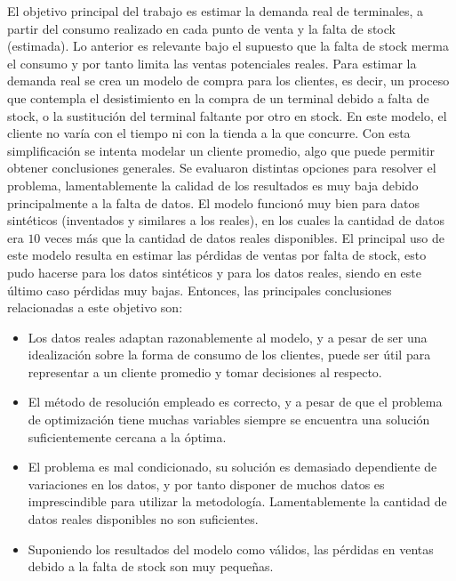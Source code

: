El objetivo principal del trabajo es estimar la demanda real de terminales, 
a partir del consumo realizado en cada punto de venta y la falta de stock (estimada).
Lo anterior es relevante bajo el supuesto que la falta de stock merma el consumo y por tanto limita las ventas potenciales reales.
Para estimar la demanda real se crea un modelo de compra para los clientes, 
es decir, un proceso que contempla el desistimiento en la compra de un terminal debido a falta de stock,
o la sustitución del terminal faltante por otro en stock.
En este modelo, el cliente no varía con el tiempo ni con la tienda a la que concurre. 
Con esta simplificación se intenta modelar un cliente promedio, algo que puede permitir obtener conclusiones generales.
Se evaluaron distintas opciones para resolver el problema,
lamentablemente la calidad de los resultados es muy baja debido principalmente a la falta de datos.
El modelo funcionó muy bien para datos sintéticos (inventados y similares a los reales), 
en los cuales la cantidad de datos era $10$ veces más que la cantidad de datos reales disponibles.
El principal uso de este modelo resulta en estimar las pérdidas de ventas por falta de stock, esto pudo hacerse para los datos sintéticos y para los datos reales, siendo en este último caso pérdidas muy bajas.
Entonces, las principales conclusiones relacionadas a este objetivo son:
\begin{itemize}
\item Los datos reales adaptan razonablemente al modelo, y a pesar de ser una idealización sobre la forma de consumo de los clientes, puede ser útil para representar a un cliente promedio y tomar decisiones al respecto.
\item El método de resolución empleado es correcto, y a pesar de que el problema de optimización tiene muchas variables siempre se encuentra una solución suficientemente cercana a la óptima. 
\item El problema es mal condicionado, su solución es demasiado dependiente de variaciones en los datos, y por tanto disponer de muchos datos es imprescindible para utilizar la metodología. Lamentablemente la cantidad de datos reales disponibles no son suficientes.
\item Suponiendo los resultados del modelo como válidos, las pérdidas en ventas debido a la falta de stock son muy pequeñas.
\end{itemize} 


